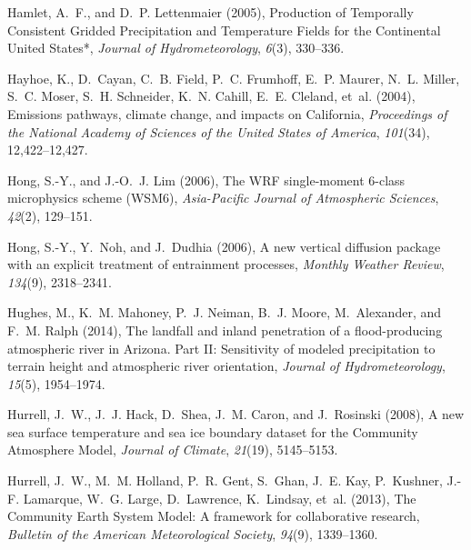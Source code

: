 \documentclass[ms]{agutex}   %
\begin{document}
\begin{article}
\begin{thebibliography}{84}
Hamlet, A.~F., and D.~P. Lettenmaier (2005), {Production of Temporally
  Consistent Gridded Precipitation and Temperature Fields for the Continental
  United States*}, \textit{Journal of Hydrometeorology}, \textit{6}(3),
  330--336.

Hayhoe, K., D.~Cayan, C.~B. Field, P.~C. Frumhoff, E.~P. Maurer, N.~L. Miller,
  S.~C. Moser, S.~H. Schneider, K.~N. Cahill, E.~E. Cleland, et~al. (2004),
  {Emissions pathways, climate change, and impacts on California},
  \textit{Proceedings of the National Academy of Sciences of the United States
  of America}, \textit{101}(34), 12,422--12,427.

Hong, S.-Y., and J.-O.~J. Lim (2006), {The WRF single-moment 6-class
  microphysics scheme (WSM6)}, \textit{Asia-Pacific Journal of Atmospheric
  Sciences}, \textit{42}(2), 129--151.

Hong, S.-Y., Y.~Noh, and J.~Dudhia (2006), A new vertical diffusion package
  with an explicit treatment of entrainment processes, \textit{Monthly Weather
  Review}, \textit{134}(9), 2318--2341.

Hughes, M., K.~M. Mahoney, P.~J. Neiman, B.~J. Moore, M.~Alexander, and F.~M.
  Ralph (2014), {The landfall and inland penetration of a flood-producing
  atmospheric river in Arizona. Part II: Sensitivity of modeled precipitation
  to terrain height and atmospheric river orientation}, \textit{Journal of
  Hydrometeorology}, \textit{15}(5), 1954--1974.

Hurrell, J.~W., J.~J. Hack, D.~Shea, J.~M. Caron, and J.~Rosinski (2008), {A
  new sea surface temperature and sea ice boundary dataset for the Community
  Atmosphere Model}, \textit{Journal of Climate}, \textit{21}(19), 5145--5153.

Hurrell, J.~W., M.~M. Holland, P.~R. Gent, S.~Ghan, J.~E. Kay, P.~Kushner,
  J.-F. Lamarque, W.~G. Large, D.~Lawrence, K.~Lindsay, et~al. (2013), {The
  Community Earth System Model: A framework for collaborative research},
  \textit{Bulletin of the American Meteorological Society}, \textit{94}(9),
  1339--1360.


\end{thebibliography}
\end{article}
\end{document}
